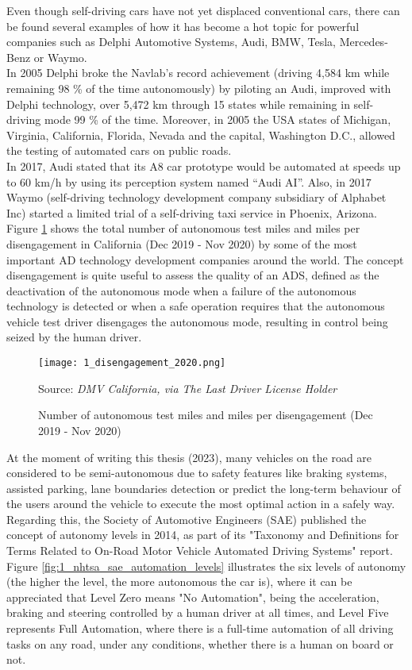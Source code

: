 Even though self-driving cars have not yet displaced conventional cars, there can be found several examples of how it has become a hot topic for powerful companies such as Delphi Automotive Systems, Audi, BMW, Tesla, Mercedes-Benz or Waymo. \\

In 2005 Delphi broke the Navlab’s record achievement (driving 4,584 km while remaining 98 \% of the time autonomously) by piloting an Audi, improved with Delphi technology, over 5,472 km through 15 states while remaining in self-driving mode 99 \% of the time. Moreover, in 2005 the USA states of Michigan, Virginia, California, Florida, Nevada and the capital, Washington D.C., allowed the testing of automated cars on public roads. \\

In 2017, Audi stated that its A8 car prototype would be automated at speeds up to 60 km/h by using its perception system named “Audi AI”.  Also, in 2017 Waymo (self-driving technology development company subsidiary of Alphabet Inc) started a limited trial of a self-driving taxi service in Phoenix, Arizona. \\

Figure \ref{fig:1_disengagement_2020} shows the total number of autonomous test miles and miles per disengagement in California (Dec 2019 - Nov 2020) by some of the most important \ac{AD} technology development companies around the world. The concept disengagement is quite useful to assess the quality of an \ac{ADS}, defined as the deactivation of the autonomous mode when a failure of the autonomous technology is detected or when a safe operation requires that the autonomous vehicle test driver disengages the autonomous mode, resulting in control being seized by the human driver.

\begin{figure}[h]
	\centering
	\texttt{[image: 1\_disengagement\_2020.png]}
	\caption{Number of autonomous test miles and miles per disengagement (Dec 2019 - Nov 2020)}
	Source: \textit{DMV California, via The Last Driver License Holder}
	\label{fig:1_disengagement_2020}
\end{figure}

At the moment of writing this thesis (2023), many vehicles on the road are considered to be semi-autonomous due to safety features like braking systems, assisted parking, lane boundaries detection or predict the long-term behaviour of the users around the vehicle to execute the most optimal action in a safely way. Regarding this, the Society of Automotive Engineers (SAE) published the concept of autonomy levels in 2014, as part of its "Taxonomy and Definitions for Terms Related to On-Road Motor Vehicle Automated Driving Systems" report. Figure \ref{fig:1_nhtsa_sae_automation_levels} illustrates the six levels of autonomy (the higher the level, the more autonomous the car is), where it can be appreciated that Level Zero means "No Automation", being the acceleration, braking and steering controlled by a human driver at all times, and Level Five represents Full Automation, where there is a full-time automation of all driving tasks on any road, under any conditions, whether there is a human on board or not.

